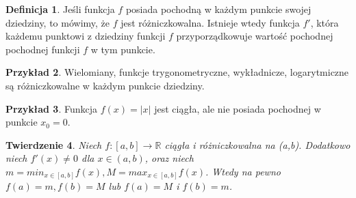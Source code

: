\documentclass[12pt,a4paper]{article}
\newtheorem{tw}{Twierdzenie}[section]
\theoremstyle{definition}
\newtheorem{df}[tw]{Definicja}
\newtheorem{ex}[tw]{Przykład}
\begin{document}
\begin{df}
Jeśli funkcja $f$ posiada pochodną w każdym punkcie swojej dziedziny, to mówimy, że $f$ jest różniczkowalna. Istnieje wtedy funkcja $f'$, która każdemu punktowi z dziedziny funkcji $f$ przyporządkowuje wartość pochodnej pochodnej funkcji $f$ w tym punkcie.
\end{df}

\begin{ex}
Wielomiany, funkcje trygonometryczne, wykładnicze, logarytmiczne są różniczkowalne w każdym punkcie dziedziny.
\end{ex}

\begin{ex}
Funkcja $f(x) = |x|$ jest ciągła, ale nie posiada pochodnej w punkcie $x_0 = 0$.
\end{ex}

\begin{tw}
Niech $f: [a,b] \rightarrow  \mathbb{R}$ ciągła i różniczkowalna na (a,b). Dodatkowo niech $f'(x) \ne  0$ dla $x \in  (a,b)$, oraz niech $m = min_{x\in [a,b]}f(x), M = max_{x\in [a,b]}f(x)$. Wtedy na pewno $f(a) = m, f(b) = M$ lub $f(a) = M$ i $f(b) = m$.
\end{tw}
\end{document}

